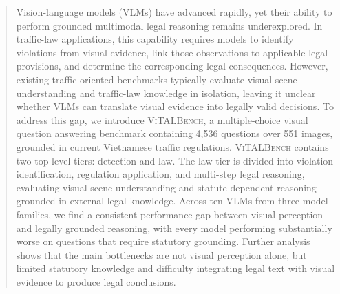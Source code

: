 \begin{abstract}
Vision-language models (VLMs) have advanced rapidly, yet their ability to perform grounded multimodal legal reasoning remains underexplored. In traffic-law applications, this capability requires models to identify violations from visual evidence, link those observations to applicable legal provisions, and determine the corresponding legal consequences. However, existing traffic-oriented benchmarks typically evaluate visual scene understanding and traffic-law knowledge in isolation, leaving it unclear whether VLMs can translate visual evidence into legally valid decisions. To address this gap, we introduce \textsc{ViTALBench}, a multiple-choice visual question answering benchmark containing 4,536 questions over 551 images, grounded in current Vietnamese traffic regulations.
\textsc{ViTALBench} contains two top-level tiers: detection and law. The law tier is divided into violation identification, regulation application, and multi-step legal reasoning, evaluating visual scene understanding and statute-dependent reasoning grounded in external legal knowledge. Across ten VLMs from three model families, we find a consistent performance gap between visual perception and legally grounded reasoning, with every model performing substantially worse on questions that require statutory grounding. Further analysis shows that the main bottlenecks are not visual perception alone, but limited statutory knowledge and difficulty integrating legal text with visual evidence to produce legal conclusions.

\end{abstract}